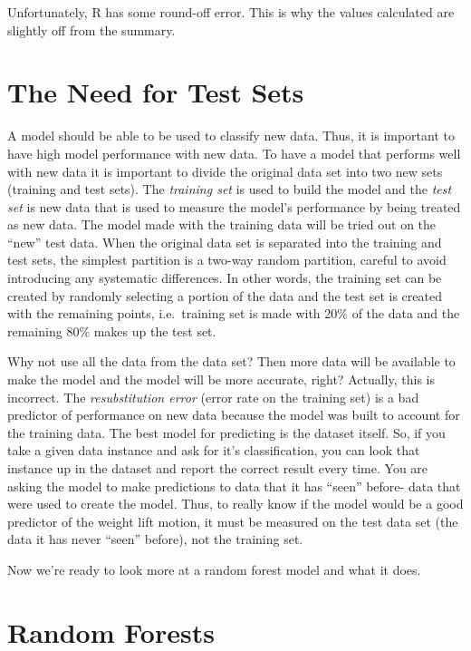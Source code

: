 \documentclass[12pt,twoside]{reedthesis}
\begin{document}
  Unfortunately, R has some round-off error. This is why the values
  calculated are slightly off from the summary.
  
  \section{The Need for Test Sets}\label{the-need-for-test-sets}
  
  A model should be able to be used to classify new data. Thus, it is
  important to have high model performance with new data. To have a model
  that performs well with new data it is important to divide the original
  data set into two new sets (training and test sets). The \emph{training
  set} is used to build the model and the \emph{test set} is new data that
  is used to measure the model's performance by being treated as new data.
  The model made with the training data will be tried out on the ``new''
  test data. When the original data set is separated into the training and
  test sets, the simplest partition is a two-way random partition, careful
  to avoid introducing any systematic differences. In other words, the
  training set can be created by randomly selecting a portion of the data
  and the test set is created with the remaining points, i.e.~training set
  is made with 20\% of the data and the remaining 80\% makes up the test
  set.
  
  Why not use all the data from the data set? Then more data will be
  available to make the model and the model will be more accurate, right?
  Actually, this is incorrect. The \emph{resubstitution error} (error rate
  on the training set) is a bad predictor of performance on new data
  because the model was built to account for the training data. The best
  model for predicting is the dataset itself. So, if you take a given data
  instance and ask for it's classification, you can look that instance up
  in the dataset and report the correct result every time. You are asking
  the model to make predictions to data that it has ``seen'' before- data
  that were used to create the model. Thus, to really know if the model
  would be a good predictor of the weight lift motion, it must be measured
  on the test data set (the data it has never ``seen'' before), not the
  training set.
  
  Now we're ready to look more at a random forest model and what it does.
  
  \section{Random Forests}\label{random-forests}
  
\end{document}
